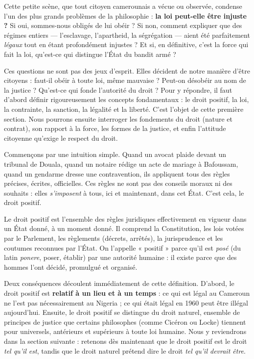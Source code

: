 \documentclass[11pt]{article}
\newcommand{\cle}[1]{{\popxbold\color{popdark}#1}}
\newcounter{popsec}
\newcounter{popsub}
\newcommand{\courssub}[1]{%
  \stepcounter{popsub}%
  \par\vspace{9pt}\noindent{\popxbold\fontsize{11.5}{13}\selectfont\color{popink}{\color{poporange}\thepopsec.\thepopsub}\hspace{6pt}#1}\par\nopagebreak\vspace{4pt}
}
\begin{document}
Cette petite scène, que tout citoyen camerounais a vécue ou observée, condense l'un des plus grands problèmes de la philosophie : \textbf{la loi peut-elle être injuste ?} Si oui, sommes-nous obligés de lui obéir ? Si non, comment expliquer que des régimes entiers — l'esclavage, l'apartheid, la ségrégation — aient été parfaitement \emph{légaux} tout en étant profondément injustes ? Et si, en définitive, c'est la force qui fait la loi, qu'est-ce qui distingue l'État du bandit armé ?

Ces questions ne sont pas des jeux d'esprit. Elles décident de notre manière d'être citoyens : faut-il obéir à toute loi, même mauvaise ? Peut-on désobéir au nom de la justice ? Qu'est-ce qui fonde l'autorité du droit ? Pour y répondre, il faut d'abord définir rigoureusement les concepts fondamentaux : le \cle{droit positif}, la \cle{loi}, la \cle{contrainte}, la \cle{sanction}, la \cle{légalité} et la \cle{liberté}. C'est l'objet de cette première section. Nous pourrons ensuite interroger les fondements du droit (nature et contrat), son rapport à la force, les formes de la justice, et enfin l'attitude citoyenne qu'exige le respect du droit.

\courssub{Le droit positif : les règles effectivement en vigueur}

Commençons par une intuition simple. Quand un avocat plaide devant un tribunal de Douala, quand un notaire rédige un acte de mariage à Bafoussam, quand un gendarme dresse une contravention, ils appliquent tous des règles précises, écrites, officielles. Ces règles ne sont pas des conseils moraux ni des souhaits : elles \emph{s'imposent} à tous, ici et maintenant, dans cet État. C'est cela, le droit positif.

\begin{definition}
Le \cle{droit positif} est l'ensemble des règles juridiques effectivement en vigueur dans un État donné, à un moment donné. Il comprend la Constitution, les lois votées par le Parlement, les règlements (décrets, arrêtés), la jurisprudence et les coutumes reconnues par l'État. On l'appelle « positif » parce qu'il est \emph{posé} (du latin \emph{ponere}, poser, établir) par une autorité humaine : il existe parce que des hommes l'ont décidé, promulgué et organisé.
\end{definition}

Deux conséquences découlent immédiatement de cette définition. D'abord, le droit positif est \textbf{relatif à un lieu et à un temps} : ce qui est légal au Cameroun ne l'est pas nécessairement au Nigeria ; ce qui était légal en 1960 peut être illégal aujourd'hui. Ensuite, le droit positif se distingue du \cle{droit naturel}, ensemble de principes de justice que certains philosophes (comme Cicéron ou Locke) tiennent pour universels, antérieurs et supérieurs à toute loi humaine. Nous y reviendrons dans la section suivante : retenons dès maintenant que le droit positif est le droit \emph{tel qu'il est}, tandis que le droit naturel prétend dire le droit \emph{tel qu'il devrait être}.
\end{document}
